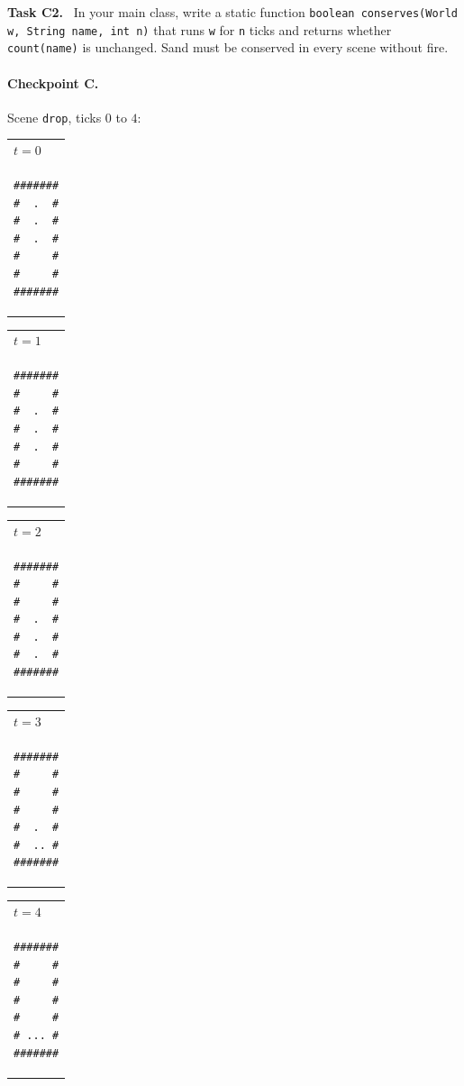 \documentclass[11pt,a4paper]{article}
\makeatletter
\newcommand{\code}[1]{\texttt{#1}}
\newenvironment{checkpoint}[1]
  {\begin{tabular}[t]{@{}l@{}}\footnotesize #1\\[2pt]}
  {\end{tabular}}
\newcommand{\task}[1]{\par\medskip\textbf{Task #1.}\ }
\makeatother
\begin{document}
\task{C2} In your main class, write a static function
\code{boolean conserves(World w, String name, int n)} that runs \code{w} for \code{n} ticks and
returns whether \code{count(name)} is unchanged. Sand must be conserved in every scene without fire.

\paragraph{Checkpoint C.} Scene \code{drop}, ticks \(0\) to \(4\):
\begin{center}
\begin{checkpoint}{$t=0$}
\begin{BVerbatim}
#######
#  .  #
#  .  #
#  .  #
#     #
#     #
#######
\end{BVerbatim}
\end{checkpoint}
\hspace{1.6em}
\begin{checkpoint}{$t=1$}
\begin{BVerbatim}
#######
#     #
#  .  #
#  .  #
#  .  #
#     #
#######
\end{BVerbatim}
\end{checkpoint}
\hspace{1.6em}
\begin{checkpoint}{$t=2$}
\begin{BVerbatim}
#######
#     #
#     #
#  .  #
#  .  #
#  .  #
#######
\end{BVerbatim}
\end{checkpoint}
\hspace{1.6em}
\begin{checkpoint}{$t=3$}
\begin{BVerbatim}
#######
#     #
#     #
#     #
#  .  #
#  .. #
#######
\end{BVerbatim}
\end{checkpoint}
\hspace{1.6em}
\begin{checkpoint}{$t=4$}
\begin{BVerbatim}
#######
#     #
#     #
#     #
#     #
# ... #
#######
\end{BVerbatim}
\end{checkpoint}
\end{center}
\end{document}
